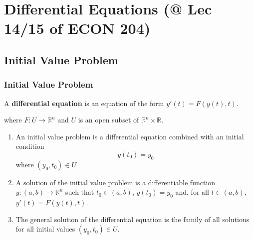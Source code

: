 \documentclass[11pt]{elegantbook}
\begin{document}
\chapter{Differential Equations \small{(@ Lec 14/15 of ECON 204)}}
\section{Initial Value Problem}
\subsection{Initial Value Problem}
\begin{definition}
    \normalfont
    A \textbf{differential equation} is an equation of the form $y'(t)=F(y(t), t)$.
\end{definition}
where $F : U \rightarrow \mathbb{R}^n$ and $U$ is an open subset of $\mathbb{R}^n\times \mathbb{R}$.

\begin{definition}
    \normalfont
    \begin{enumerate}
        \item An initial value problem is a differential equation combined with an initial condition $$y(t_0)=y_0$$
        where $(y_0,t_0)\in U$
        \item A solution of the initial value problem is a differentiable function $y : (a, b) \rightarrow \mathbb{R}^n$ such that $t_0 \in (a, b)$, $y(t_0) = y_0$ and, for all $t \in (a, b)$, $y'(t)=F(y(t), t)$.
        \item The general solution of the differential equation is the family of all solutions for all initial values $(y_0, t_0) \in U$.
    \end{enumerate}
\end{definition}
\end{document}
